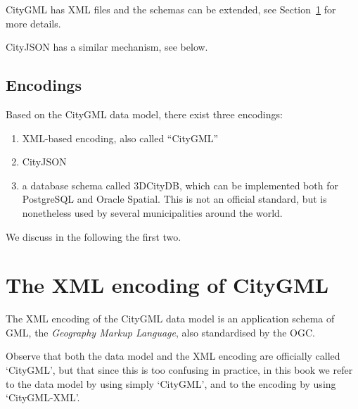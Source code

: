 CityGML has XML files and the schemas can be extended, see Section~\ref{sec:citygmlxml} for more details. 

CityJSON has a similar mechanism, see below.








\subsection{Encodings}

Based on the CityGML data model, there exist three encodings:
\begin{enumerate}
  \item XML-based encoding, also called ``CityGML''
  \item CityJSON
  \item a database schema called 3DCityDB, which can be implemented both for PostgreSQL and Oracle Spatial. This is not an official standard, but is nonetheless used by several municipalities around the world.
\end{enumerate}
We discuss in the following the first two.


\section[XML-encoded CityGML]{The XML encoding of CityGML}%
\label{sec:citygmlxml}

The XML encoding of the CityGML data model is an application schema of GML, the \emph{Geography Markup Language}, also standardised by the OGC.

Observe that both the data model and the XML encoding are officially called `CityGML', but that since this is too confusing in practice, in this book we refer to the data model by using simply `CityGML', and to the encoding by using `CityGML-XML'.

